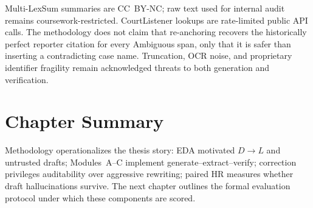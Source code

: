 Multi-LexSum summaries are CC~BY-NC; raw text used for internal audit remains coursework-restricted. CourtListener lookups are rate-limited public API calls. The methodology does not claim that re-anchoring recovers the historically perfect reporter citation for every Ambiguous span, only that it is safer than inserting a contradicting case name. Truncation, OCR noise, and proprietary identifier fragility remain acknowledged threats to both generation and verification.

\section{Chapter Summary}
\label{sec:method-summary}

Methodology operationalizes the thesis story: EDA motivated $D\rightarrow L$ and untrusted drafts; Modules~A--C implement generate--extract--verify; correction privileges auditability over aggressive rewriting; paired HR measures whether draft hallucinations survive. The next chapter outlines the formal evaluation protocol under which these components are scored.

